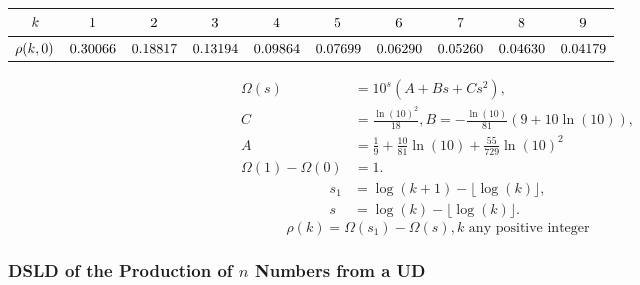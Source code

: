 \documentclass[titlepage,fleqn]{article}%
\begin{document}
\begin{tabular}
[c]{|c|c|c|c|c|c|c|c|c|c|}\hline\hline
${\small k}$ & ${\small 1}$ & ${\small 2}$ & ${\small 3}$ & ${\small 4}$ &
${\small 5}$ & ${\small 6}$ & ${\small 7}$ & ${\small 8}$ & ${\small 9}%
$\\\hline
${\small \rho(k,0)}$ & ${\small 0.30066}$ & ${\small 0.18817}$ &
${\small 0.13194}$ & ${\small 0.09864}$ & ${\small 0.07699}$ &
${\small 0.06290}$ & ${\small 0.05260}$ & ${\small 0.04630}$ &
${\small 0.04179}$\\\hline\hline
\end{tabular}
%

\begin{align*}
\Omega(s)  &  =10^{s}\left(  A+Bs+Cs^{2}\right)  ,\\
C  &  =\frac{\ln(10)^{2}}{18},B=-\frac{\ln(10)}{81}(9+10\ln(10)),\\
A  &  =\frac{1}{9}+\frac{10}{81}\ln(10)+\frac{55}{729}\ln(10)^{2}\\
\Omega(1)-\Omega(0)  &  =1.
\end{align*}%
\begin{align*}
s_{1}  &  =\log(k+1)-\lfloor\log(k)\rfloor,\\
s  &  =\log(k)-\lfloor\log(k)\rfloor.
\end{align*}%
\[
\rho(k)=\Omega(s_{1})-\Omega(s),k\text{ \ any positive integer}%
\]


\subsubsection{DSLD of the Production of $n$ Numbers from a UD}%

\label{PnNfUD}%
\end{document}
